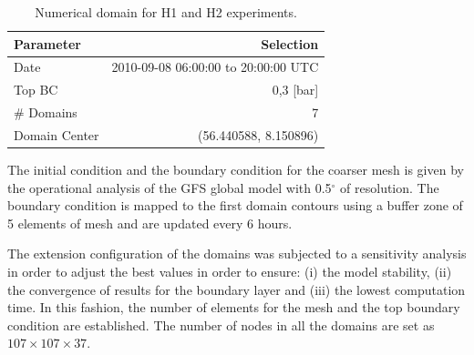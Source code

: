 \begin{table}[h!]
	\caption{Numerical domain for H1 and H2 experiments.}\label{tab:05_config_hov}
	\centering
	\begin{tabular}{lr}
		\toprule
		Parameter & Selection \\
		\midrule
		Date	 	 & 2010-09-08 06:00:00  to 20:00:00 UTC  \\
		Top BC	& 0,3 [bar]\\
		\# Domains	& 7   \\
		Domain Center	& (56.440588, 8.150896)   \\
		\bottomrule
	\end{tabular}
\end{table}

The initial condition and the boundary condition for the coarser mesh is given by the operational analysis of the GFS global model with 0.5$^\circ$ of resolution. The boundary condition is mapped to the first domain contours using a buffer zone of 5 elements of mesh and are updated every 6 hours. 

The extension configuration of the domains was subjected to a sensitivity analysis in order to adjust the best values in order to ensure: (i) the model stability, (ii) the convergence of results for the boundary layer and (iii) the lowest computation time. In this fashion, the number of elements for the mesh and the top boundary condition are established. The number of nodes in all the domains are set as $107\times107\times37$.

